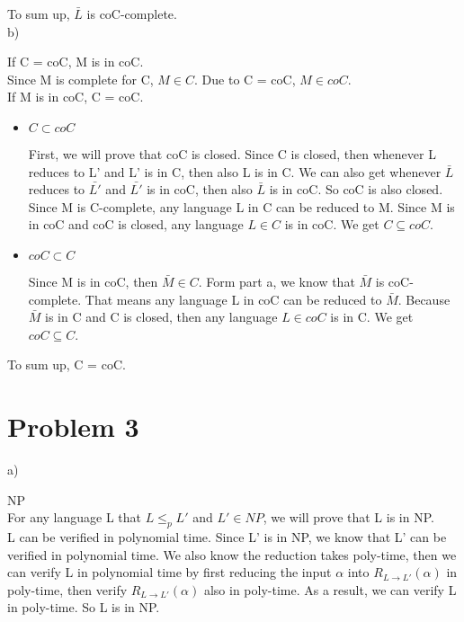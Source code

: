 \documentclass[12pt]{article}
\begin{document}
To sum up, $\bar {L}$ is coC-complete. \\

b)

If C = coC, M is in coC. \\

Since M is complete for C, $M \in C$. Due to C = coC, $M \in coC$. \\

If M is in coC, C = coC. \\

\begin{itemize}
\item $C \subset coC$

  First, we will prove that coC is closed. Since C is closed, then
  whenever L reduces to L' and L' is in C, then also L is in C. We can
  also get whenever $\bar {L}$ reduces to $\bar {L'}$ and $\bar {L'}$
  is in coC, then also $\bar {L}$ is in coC. So coC is also closed. \\ 

  Since M is C-complete, any language L in C can be reduced to M. Since
  M is in coC and coC is closed, any language $L \in C$ is in coC. We
  get $C \subseteq coC$.
\item $coC \subset C$

  Since M is in coC, then $\bar {M} \in C$. Form part a, we know that
  $\bar {M}$ is coC-complete. That means any language L in coC can be
  reduced to $\bar {M}$. Because $\bar {M}$ is in C and C is closed,
  then any language $L \in coC$ is in C. We get $coC \subseteq C$. \\
\end{itemize}

To sum up, C = coC.

\section*{Problem 3}

a)

NP \\

For any language L that $L \le_p L'$ and $L' \in NP$, we will prove
that L is in NP. \\

L can be verified in polynomial time. Since L' is in NP, we know that
L' can be verified in polynomial time. We also know the reduction
takes poly-time, then we can verify L in polynomial time by first
reducing the input $\alpha$ into $R_{L \to L'}(\alpha)$ in poly-time,
then verify $R_{L \to L'}(\alpha)$ also in poly-time. As a result, we
can verify L in poly-time. So L is in NP. \\ 
\end{document}
